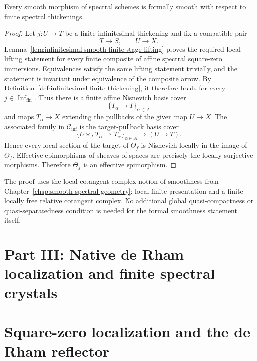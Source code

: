 \begin{theorem}
\label{thm:infinitesimal-smooth-formally-smooth}
Every smooth morphism of spectral schemes is formally smooth with respect to
finite spectral thickenings.
\end{theorem}

\begin{proof}
Let $j:U\to T$ be a finite infinitesimal thickening and fix a compatible pair
\[
    T\to S,
    \qquad
    U\to X.
\]
Lemma~\ref{lem:infinitesimal-smooth-finite-stage-lifting} proves the required
local lifting statement for every finite composite of affine spectral
square-zero immersions.  Equivalences satisfy the same lifting statement
trivially, and the statement is invariant under equivalence of the composite
arrow.  By Definition~\ref{def:infinitesimal-finite-thickening}, it therefore
holds for every \(j\in\operatorname{Inf}_{\mathrm{fin}}\).  Thus there is a finite affine
Nisnevich basis cover
\[
    \{T_\alpha\to T\}_{\alpha\in A}
\]
and maps $T_\alpha\to X$ extending the pullbacks of the given map $U\to X$.
The associated family in $\mathcal C_{\mathrm{inf}}$ is the target-pullback
basis cover
\[
    \{U\times_TT_\alpha\to T_\alpha\}_{\alpha\in A}
    \longrightarrow
    (U\to T).
\]
Hence every local section of the target of $\Theta_f$ is Nisnevich-locally in
the image of $\Theta_f$.  Effective epimorphisms of sheaves of spaces are
precisely the locally surjective morphisms.  Therefore $\Theta_f$ is an
effective epimorphism.
\end{proof}

\begin{remark}
\label{rem:infinitesimal-smooth-no-global-fp}
The proof uses the local cotangent-complex notion of smoothness from
Chapter~\ref{chap:smooth-spectral-geometry}: local finite presentation and a
finite locally free relative cotangent complex.  No additional global
quasi-compactness or quasi-separatedness condition is needed for the formal
smoothness statement itself.
\end{remark}

\section*{Part III: Native de Rham localization and finite spectral crystals}

\section{Square-zero localization and the de Rham reflector}
\label{sec:infinitesimal-dr-localization}

